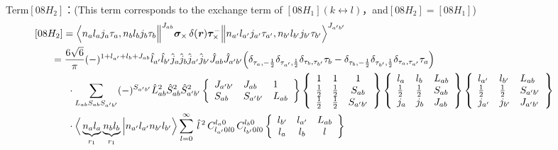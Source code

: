\documentclass[master]{shnuthesis}
\newcommand{\bmr}{\textbf{\textit{r}}}
\newcommand{\ap}{a^\prime}
\newcommand{\bp}{b^\prime}
\newcommand{\il}{\!\!\!\!\!\!\!\!\!\!}
\newcommand{\ii}{\!\!\!\!\!\!\!\!\!\!\!\!\!\!\!\!\!\!\!\!}
\begin{document}
{\color{red}Term$[08H_2]$：}(This term corresponds to the exchange term of $[08H_1]$$(k \longleftrightarrow l)$，and$[08H_2]=[08H_1]$)
\begin{align}
    &\ii [08H_2] = \Big\langle n_a l_a j_a \tau_a, n_b l_b j_b \tau_b \Big\|^{J_{ab}} \bm{\sigma}_\times \,\delta(\bmr) \bm{\tau}_\times^- \Big\| n_{\ap} l_{\ap} j_{\ap} \tau_{\ap}, n_{\bp} l_{\bp} j_{\bp} \tau_{\bp} \Big\rangle^{J_{\ap \bp}} \\
    &\il = \frac{6\sqrt{6}}{\pi} (-)^{1+l_{\ap}+l_b+J_{ab}} \hat{l}_{\ap}\hat{l}_{\bp}\hat{j}_a\hat{j}_b\hat{j}_{\ap}\hat{j}_{\bp}\hat{J}_{ab}\hat{J}_{\ap\bp} \Big( \delta_{\tau_a,-\frac{1}{2}}\delta_{\tau_{\ap},\frac{1}{2}}\delta_{\tau_b,\tau_{\bp}}\tau_b - \delta_{\tau_b,-\frac{1}{2}}\delta_{\tau_{\bp},\frac{1}{2}}\delta_{\tau_a,\tau_{\ap}}\tau_a \Big) \notag\\
    & \cdot \sum_{L_{ab}S_{ab}S_{\ap\bp}} (-)^{S_{\ap\bp}} \hat{L}_{ab}^2\hat{S}_{ab}^2\hat{S}_{\ap\bp}^2  \left\{\begin{array}{lll} J_{\ap\bp} & J_{ab} & 1 \\ S_{ab} & S_{\ap\bp} & L_{ab} \end{array}\right\}  \left\{\begin{array}{ccc} 1 & 1 & 1 \\ \frac{1}{2} & \frac{1}{2} & S_{ab} \\ \frac{1}{2} & \frac{1}{2} & S_{\ap\bp} \end{array}\right\}  \left\{\begin{array}{lll}l_{a} & l_{b} & L_{ab} \\ \frac{1}{2} & \frac{1}{2} & S_{ab} \\j_{a} & j_{b} & J_{ab} \end{array}\right\}  \left\{\begin{array}{lll} l_{\ap} & l_{\bp} & L_{ab} \\ \frac{1}{2} & \frac{1}{2} & S_{\ap\bp} \\j_{\ap} & j_{\bp} & J_{\ap\bp} \end{array}\right\}  \notag \\
    & \cdot \Big\langle \underbrace{n_a l_a}_{r_1} \underbrace{n_b l_b}_{r_1} \Big| n_{\ap} l_{\ap} n_{\bp} l_{\bp} \Big\rangle \sum_{l=0}^\infty \,\hat{l}^{\,2}\,C_{l_{\ap} 0 l 0}^{l_a 0} \,C_{l_{\bp} 0 l 0}^{l_b 0}  \left\{\begin{array}{ccc} l_{\bp} & l_{\ap} & L_{ab} \\ l_a & l_b & l \end{array}\right\}
\end{align}
$$
\end{document}
